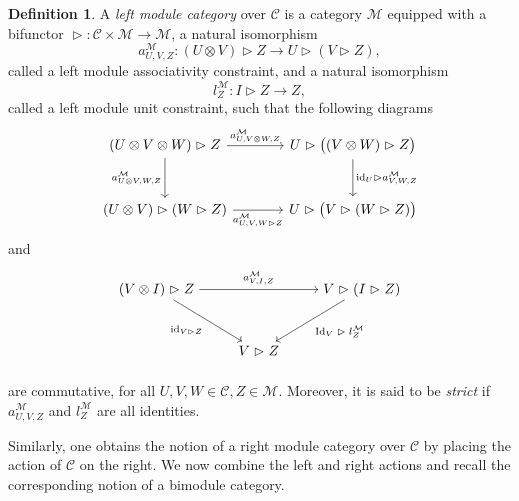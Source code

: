 \documentclass[11pt]{amsart}
\newcommand{\calC}{\mathcal{C}}
\newcommand{\id}{\mathrm{id}}
\theoremstyle{definition}
\newtheorem{defi}[theo]{Definition}
\numberwithin{equation}{section}
\begin{document}
\begin{defi}
A \emph{left module category} over $\mathcal{C}$ is a category $\mathcal{M}$ equipped with a bifunctor $\vartriangleright : \mathcal{C} \times \mathcal{M} \rightarrow \mathcal{M}$, a natural isomorphism \[a^{\mathcal{M}}_{U,V,Z} :(U\otimes V)\vartriangleright Z \to U\vartriangleright (V \vartriangleright Z),\]  called a left module associativity constraint, and a natural isomorphism \[l^{\mathcal{M}}_Z : I \vartriangleright Z \to Z,\] called a left module unit constraint,  such that the following diagrams
\begin{equation}\label{module1}
				\begin{tikzcd}[sep=large]
					(U \otimes V \otimes W) \vartriangleright Z \ar[r, "a^{\mathcal{M}}_{U,V\otimes W,Z}"] \ar[d, "a^{\mathcal{M}}_{U\otimes V,W,Z}"'] & U \vartriangleright \big((V \otimes W) \vartriangleright Z\big) \ar[d, "\id_U\vartriangleright a^{\mathcal{M}}_{V,W,Z}"] \\
					(U \otimes V) \vartriangleright (W \vartriangleright Z) \ar[r, "a^{\mathcal{M}}_{U,V,W\vartriangleright Z}"']             & U \vartriangleright \big(V \vartriangleright (W \vartriangleright Z)\big)
				\end{tikzcd}
\end{equation}
and
\begin{equation}\label{module2}
				\begin{tikzpicture}[description/.style={fill=white,inner sep=2pt}]
					\matrix (m) [matrix of math nodes, row sep=3em,
					column sep=2.5em, text height=1.5ex, text depth=0.25ex]
					{ 
						(V \otimes I) \vartriangleright Z & & V \vartriangleright (I \vartriangleright Z) \\
						& V \vartriangleright Z & \\
					};
					\path[->,font=\scriptsize]
					(m-1-1) edge node[auto] {$a^{\mathcal{M}}_{V, I, Z}$} (m-1-3)
					(m-1-1) edge node[auto,swap] {$\id_{V\vartriangleright Z} $} (m-2-2)
					(m-1-3) edge node[auto] {$\text{Id}_V \vartriangleright l^{\mathcal{M}}_Z$} (m-2-2);
				\end{tikzpicture}
\end{equation}
are commutative, for all $U,V,W \in \calC, Z\in \mathcal{M}$. Moreover, it is said to be \emph{strict} if $a^{\mathcal{M}}_{U,V,Z}$ and $l^{\mathcal{M}}_{Z}$ are all identities. 
\end{defi}
Similarly, one obtains the notion of a right module category over $\mathcal{C}$ by placing the action of $\mathcal{C}$ on the right. 
We now combine the left and right actions and recall the corresponding notion of a bimodule category. 
\end{document}
